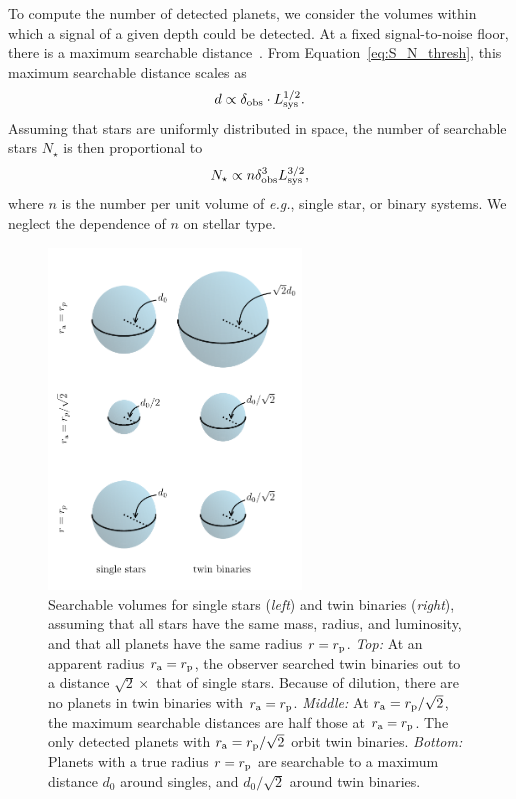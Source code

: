 \documentclass[12pt,modern]{aastex61}
\renewcommand{\a}{_{\rm a}}
\newcommand{\p}{_{\rm p}}
\begin{document}
To compute the number of detected planets, we consider the volumes within 
which a signal of a given depth could be detected. At a fixed signal-to-noise floor, 
there is a maximum searchable 
distance~\citep{pepper_using_2003,pepper_searching_2005}.
From Equation~\ref{eq:S_N_thresh}, this maximum searchable distance scales as
\begin{equation}
d \propto \delta_{\rm obs} \cdot L_{\rm 
    sys}^{1/2}.
\end{equation}
Assuming that stars are uniformly distributed in space, the number 
of searchable stars $N_\star$ is then proportional to
\begin{equation}
N_\star \propto n \delta_{\rm obs}^3 L_{\rm 
    sys}^{3/2},
\label{eq:N_searchable_prop}
\end{equation}
where $n$ is the number per unit volume of {\it e.g.}, single star, or binary 
systems.
We neglect the dependence of $n$ on stellar type.


\begin{figure}[!tb]
    \begin{center}
        \includegraphics[width=0.6\textwidth]{figures/visualize_volumes.pdf}
    \end{center}
    \caption{
        Searchable volumes for single stars ({\it left}) and 
        twin binaries ({\it right}), assuming that all stars have the 
        same mass, radius, and luminosity, and that all planets have the same 
        radius $r=r\p$.
        {\it Top:} At an apparent radius $r\a=r\p$,
        the observer searched twin binaries out to a
        distance $\sqrt{2}\times$ that of single stars.
        Because of dilution, there are no planets in twin binaries with 
        $r\a=r\p$.
        {\it Middle:} At $r\a=r\p/\sqrt{2}$, the 
        maximum searchable distances are half those at $r\a=r\p$. 
        The only detected planets with $r\a=r\p/\sqrt{2}$ orbit twin binaries.
        {\it Bottom:} Planets with a true radius $r=r\p$ are searchable to 
        a maximum distance $d_0$ around singles, and $d_0/\sqrt{2}$ around 
        twin binaries.
    }
    \label{fig:model_1_volumes}
\end{figure}
\end{document}

